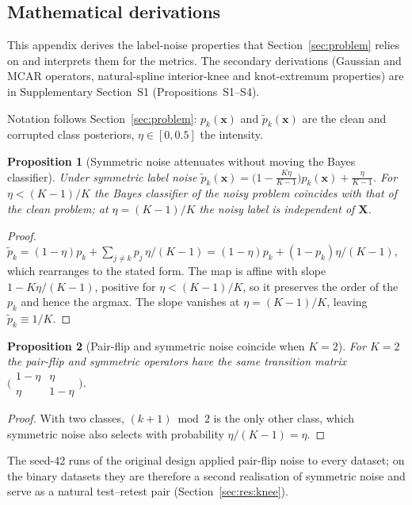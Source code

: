 \documentclass[pdflatex,sn-mathphys]{sn-jnl}
\theoremstyle{thmstyleone}
\newtheorem{appproposition}{Proposition}
\theoremstyle{thmstyletwo}
\theoremstyle{thmstylethree}
\begin{document}
\begin{appendices}

\section{Mathematical derivations}\label{app:math}
This appendix derives the label-noise properties that Section~\ref{sec:problem} relies on and interprets them for the metrics. The secondary derivations (Gaussian and MCAR operators, natural-spline interior-knee and knot-extremum properties) are in Supplementary Section~S1 (Propositions~S1--S4).

Notation follows Section~\ref{sec:problem}: $p_k(\mathbf{x})$ and $\tilde p_k(\mathbf{x})$ are the clean and corrupted class posteriors, $\eta\in[0,0.5]$ the intensity.

\begin{appproposition}[Symmetric noise attenuates without moving the Bayes classifier]\label{prop:a_symmetric}
Under symmetric label noise $\tilde{p}_k(\mathbf{x})=\bigl(1-\frac{K\eta}{K-1}\bigr)p_k(\mathbf{x})+\frac{\eta}{K-1}$. For $\eta<(K-1)/K$ the Bayes classifier of the noisy problem coincides with that of the clean problem; at $\eta=(K-1)/K$ the noisy label is independent of $\mathbf{X}$.
\end{appproposition}
\begin{proof}
$\tilde{p}_k=(1-\eta)p_k+\sum_{j\ne k}p_j\,\eta/(K-1)=(1-\eta)p_k+(1-p_k)\eta/(K-1)$, which rearranges to the stated form. The map is affine with slope $1-K\eta/(K-1)$, positive for $\eta<(K-1)/K$, so it preserves the order of the $p_k$ and hence the argmax. The slope vanishes at $\eta=(K-1)/K$, leaving $\tilde{p}_k\equiv 1/K$.
\end{proof}

\begin{appproposition}[Pair-flip and symmetric noise coincide when $K=2$]\label{prop:a_pairflip_binary}
For $K=2$ the pair-flip and symmetric operators have the same transition matrix $\bigl(\begin{smallmatrix}1-\eta&\eta\\ \eta&1-\eta\end{smallmatrix}\bigr)$.
\end{appproposition}
\begin{proof}
With two classes, $(k+1)\bmod 2$ is the only other class, which symmetric noise also selects with probability $\eta/(K-1)=\eta$.
\end{proof}
The seed-42 runs of the original design applied pair-flip noise to every dataset; on the binary datasets they are therefore a second realisation of symmetric noise and serve as a natural test--retest pair (Section~\ref{sec:res:knee}).


\end{appendices}
\end{document}
